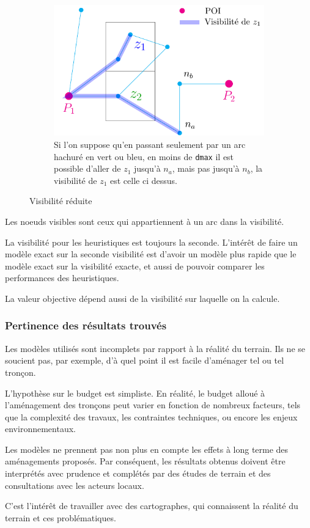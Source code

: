 \begin{figure}[H]
    \hfill
    \begin{subfigure}[t]{0.3\textwidth}
        \centering
        \includegraphics[width=1\linewidth]{PDFs/visi_z1.pdf}
    \caption{Si l'on suppose qu'en passant seulement par un arc hachuré en vert ou bleu, en moins de \texttt{dmax} il est possible d'aller de $z_1$ jusqu'à $n_a$, mais pas jusqu'à $n_b$, la visibilité de $z_1$ est celle ci dessus.}
    \end{subfigure}
    \caption{Visibilité réduite}
    \label{fig:smallvisi}
\end{figure}

Les noeuds visibles sont ceux qui appartiennent à un arc dans la visibilité.

La visibilité pour les heuristiques est toujours la seconde. L'intérêt de faire un modèle exact sur la seconde visibilité est d'avoir un modèle plus rapide que le modèle exact sur la visibilité exacte, et aussi de pouvoir comparer les performances des heuristiques.

La valeur objective dépend aussi de la visibilité sur laquelle on la calcule.



\subsubsection{Pertinence des résultats trouvés}

Les modèles utilisés sont incomplets par rapport à la réalité du terrain. Ils ne se soucient pas, par exemple, d'à quel point il est facile d'aménager tel ou tel tronçon. 

L'hypothèse sur le budget est simpliste. En réalité, le budget alloué à l'aménagement des tronçons peut varier en fonction de nombreux facteurs, tels que la complexité des travaux, les contraintes techniques, ou encore les enjeux environnementaux.

Les modèles ne prennent pas non plus en compte les effets à long terme des aménagements proposés. Par conséquent, les résultats obtenus doivent être interprétés avec prudence et complétés par des études de terrain et des consultations avec les acteurs locaux.

C'est l'intérêt de travailler avec des cartographes, qui connaissent la réalité du terrain et ces problématiques.